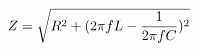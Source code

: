 \documentclass[preview]{standalone}
\begin{document}
\begin{align*}
Z = \sqrt{ R^2 + ( 2\pi f L - {1 \over 2\pi f C} )^2}
\end{align*}
\end{document}
